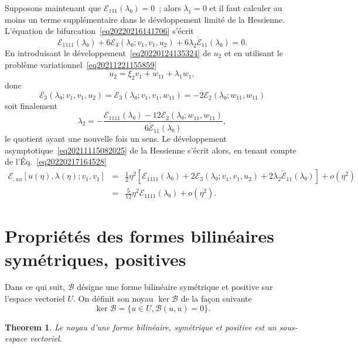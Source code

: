 \documentclass{article}
\newtheorem{theorem}{Theorem}
\begin{document}
Supposons maintenant que $ℰ_{1  1  1} (λ₀) =
0$~; alors $λ_1 = 0$ et il faut calculer au moins un terme
supplémentaire dans le développement limité de la Hessienne.
L'équation de bifurcation~\eqref{eq20220216141706} s'écrit
\begin{equation}
  \label{eq20220217164528} ℰ_{1  1  1  1}
  (λ₀) + 6ℰ_3 (λ₀ ; v_1, v_1, u_2) + 6 λ_2
  \dot{ℰ}_{1  1} (λ₀) = 0.
\end{equation}
En introduisant le développement~\eqref{eq20220124135324} de $u_2$ et en
utilisant le problème variationnel~\eqref{eq20211221155859}
\begin{equation}
  u_2 = ξ_2 v_1 + w_{1  1} + λ_1 w_1,
\end{equation}
donc
\begin{equation}
  ℰ_3 (λ₀ ; v_1, v_1, u_2) =ℰ_3 (λ₀ ; v_1,
  v_1, w_{1  1}) = - 2ℰ_2 (λ₀ ; w_{11}, w_{11})
\end{equation}
soit finalement
\begin{equation} λ_2 = - \frac{ℰ_{1  1  1  1}
   (λ₀) - 12ℰ_2 (λ₀ ; w_{11}, w_{11})}{6
   \dot{ℰ}_{1  1} (λ₀)}, \end{equation}
le quotient ayant une nouvelle fois un sens. Le développement
asymptotique~\eqref{eq20211115082025} de la Hessienne s'écrit alors, en
tenant compte de l'Éq.~\eqref{eq20220217164528}
\begin{eqnarray}
  ℰ_{, u  u} [u (η), λ (η) ; v_1, v_1] & = &
  \tfrac{1}{2} η^2  [ℰ_{1  1  1  1}
  (λ₀) + 2ℰ_3 (λ₀ ; v_1, v_1, u_2) + 2 λ_2
  \dot{ℰ}_{1  1} (λ₀)] + o (η^2) \nonumber\\
  & = & \tfrac{5}{12} η^2 ℰ_{1  1  1  1}
  (λ₀) + o (η^2) .
\end{eqnarray}

\section{Propriétés des formes bilinéaires symétriques,
positives}

Dans ce qui suit, $\mathcal{B}$ désigne une forme bilinéaire
symétrique et positive sur l'espace vectoriel $U$. On définit son
noyau $\ker \mathcal{B}$ de la fa{\c c}on suivante
\begin{equation}
  \ker \mathcal{B}= \{u∈U, \mathcal{B}(u, u) = 0\} .
\end{equation}
\begin{theorem}
  Le noyau d'une forme bilinéaire, symétrique et positive est un
  sous-espace vectoriel.
\end{theorem}
\end{document}
